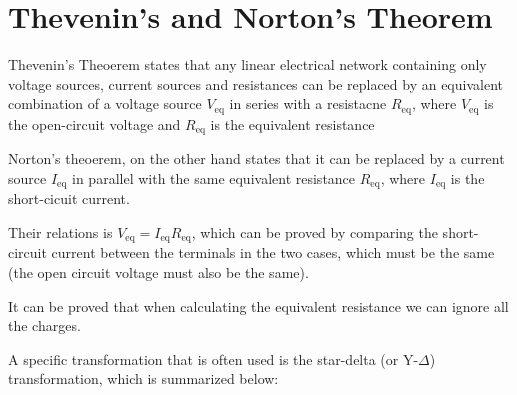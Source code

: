 \documentclass[english,a4paper,12pt]{report}
\begin{document}


\section{Thevenin's and Norton's Theorem}

Thevenin's Theoerem states that any linear electrical network containing only voltage sources, current sources and resistances can be replaced by an equivalent combination of a voltage source \(V_{\text{eq} } \) in series with a resistacne \(R_{\text{eq} } \), where \(V_{\text{eq} } \) is the open-circuit voltage and \(R_{\text{eq} } \) is the equivalent resistance

Norton's theoerem, on the other hand states that it can be replaced by a current source \(I_{\text{eq} } \) in parallel with the same equivalent resistance \(R_{\text{eq} } \), where \(I_{\text{eq} } \) is the short-cicuit current.

Their relations is \(V_{\text{eq} } = I_{\text{eq} }R_{\text{eq} }\), which can be proved by comparing the short-circuit current between the terminals in the two cases, which must be the same (the open circuit voltage must also be the same). 

It can be proved that when calculating the equivalent resistance we can ignore all the charges.

A specific transformation that is often used is the star-delta (or Y-\(\Delta \)) transformation, which is summarized below:

\begin{center}
\end{center}
    
\end{document}
